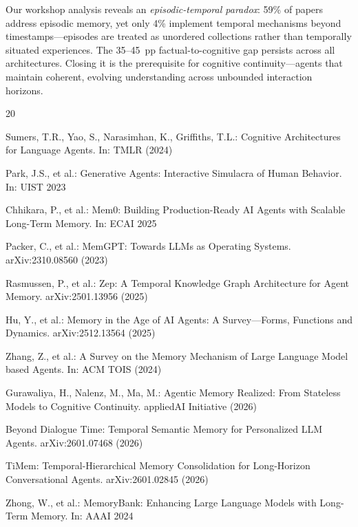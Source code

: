 \documentclass[runningheads]{llncs}
\begin{document}
Our workshop analysis reveals an \emph{episodic-temporal paradox}:
59\% of papers address episodic memory, yet only 4\% implement
temporal mechanisms beyond timestamps---episodes are treated as
unordered collections rather than temporally situated experiences.
The 35--45~pp factual-to-cognitive gap persists across all
architectures. Closing it is the prerequisite for cognitive
continuity---agents that maintain coherent, evolving understanding
across unbounded interaction horizons.

\begin{thebibliography}{20}

Sumers, T.R., Yao, S., Narasimhan, K., Griffiths, T.L.: Cognitive
Architectures for Language Agents. In: TMLR (2024)

Park, J.S., et al.: Generative Agents: Interactive Simulacra of Human
Behavior. In: UIST 2023

Chhikara, P., et al.: Mem0: Building Production-Ready AI Agents with
Scalable Long-Term Memory. In: ECAI 2025

Packer, C., et al.: MemGPT: Towards LLMs as Operating Systems.
arXiv:2310.08560 (2023)

Rasmussen, P., et al.: Zep: A Temporal Knowledge Graph Architecture for
Agent Memory. arXiv:2501.13956 (2025)

Hu, Y., et al.: Memory in the Age of AI Agents: A Survey---Forms,
Functions and Dynamics. arXiv:2512.13564 (2025)

Zhang, Z., et al.: A Survey on the Memory Mechanism of Large Language
Model based Agents. In: ACM TOIS (2024)

Gurawaliya, H., Nalenz, M., Ma, M.: Agentic Memory Realized: From
Stateless Models to Cognitive Continuity. appliedAI Initiative (2026)

Beyond Dialogue Time: Temporal Semantic Memory for Personalized LLM Agents.
arXiv:2601.07468 (2026)

TiMem: Temporal-Hierarchical Memory Consolidation for Long-Horizon
Conversational Agents. arXiv:2601.02845 (2026)

Zhong, W., et al.: MemoryBank: Enhancing Large Language Models with
Long-Term Memory. In: AAAI 2024


\end{thebibliography}
\end{document}
